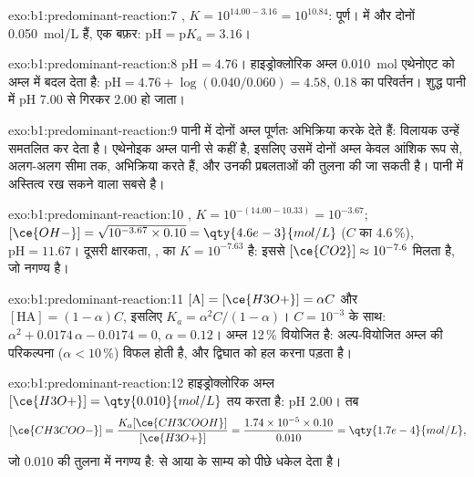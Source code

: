\begin{solution}{exo:b1:predominant-reaction:7}
, $K = 10^{14.00 - 3.16} = 10^{10.84}$: पूर्ण।
 में  और  दोनों \qty{0.050}{mol/L} हैं, एक
बफ़र: $\mathrm{pH} = \mathrm{p}K_a = 3.16$।
\end{solution}

\begin{solution}{exo:b1:predominant-reaction:8}
$\mathrm{pH} = 4.76$। हाइड्रोक्लोरिक अम्ल \qty{0.010}{mol}
एथेनोएट को अम्ल में बदल देता है: $\mathrm{pH} = 4.76 + \log(0.040/0.060) = 4.58$,
0.18 का परिवर्तन। शुद्ध पानी में pH 7.00 से गिरकर 2.00 हो जाता।
\end{solution}

\begin{solution}{exo:b1:predominant-reaction:9}
पानी में दोनों अम्ल पूर्णतः अभिक्रिया करके  देते हैं: विलायक उन्हें
समतलित कर देता है। एथेनोइक अम्ल पानी से कहीं  है, इसलिए उसमें दोनों
अम्ल केवल आंशिक रूप से, अलग-अलग सीमा तक, अभिक्रिया करते हैं, और उनकी प्रबलताओं की
तुलना की जा सकती है। पानी में अस्तित्व रख सकने वाला सबसे   है।
\end{solution}

\begin{solution}{exo:b1:predominant-reaction:10}
, $K = 10^{-(14.00 - 10.33)} = 10^{-3.67}$;
$[\ce{OH-}] = \sqrt{10^{-3.67} \times 0.10} = \qty{4.6e-3}{mol/L}$ ($C$ का
4.6\,\%), $\mathrm{pH} = 11.67$। दूसरी क्षारकता, , का $K = 10^{-7.63}$ है: इससे $[\ce{CO2}] \approx
10^{-7.6}$ मिलता है, जो नगण्य है।
\end{solution}

\begin{solution}{exo:b1:predominant-reaction:11}
$[\mathrm{A}] = [\ce{H3O+}] = \alpha C$ और $[\mathrm{HA}] = (1 - \alpha)C$,
इसलिए $K_a = \alpha^2C/(1 - \alpha)$। $C = 10^{-3}$ के साथ: $\alpha^2 +
0.0174\,\alpha - 0.0174 = 0$, $\alpha = 0.12$। अम्ल 12\,\%
वियोजित है: अल्प-वियोजित अम्ल की परिकल्पना ($\alpha <
10\,\%$) विफल होती है, और द्विघात को हल करना पड़ता है।
\end{solution}

\begin{solution}{exo:b1:predominant-reaction:12}
हाइड्रोक्लोरिक अम्ल $[\ce{H3O+}] = \qty{0.010}{mol/L}$ तय करता है: pH 2.00। तब
\[
  [\ce{CH3COO-}] = \frac{K_a[\ce{CH3COOH}]}{[\ce{H3O+}]} = \frac{1.74 \times 10^{-5}
  \times 0.10}{0.010} = \qty{1.7e-4}{mol/L},
\]
जो 0.010 की तुलना में नगण्य है:  से आया
  के साम्य को पीछे धकेल देता है।
\end{solution}

